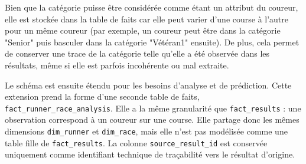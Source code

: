 \documentclass[12pt,a4paper]{article}
\begin{document}
Bien que la catégorie puisse être considérée comme étant un attribut du coureur, elle est stockée dans la table de faits car elle peut varier d'une course à l'autre pour un même coureur (par exemple, un coureur peut être dans la catégorie "Senior" puis basculer dans la catégorie "Vétéran1" ensuite). De plus, cela permet de conserver une trace de la catégorie telle qu'elle a été observée dans les résultats, même si elle est parfois incohérente ou mal extraite.

Le schéma est ensuite étendu pour les besoins d'analyse et de prédiction. Cette extension prend la forme d'une seconde table de faits, \texttt{fact\_runner\_race\_analysis}. Elle a la même granularité que \texttt{fact\_results} : une observation correspond à un coureur sur une course. Elle partage donc les mêmes dimensions \texttt{dim\_runner} et \texttt{dim\_race}, mais elle n'est pas modélisée comme une table fille de \texttt{fact\_results}. La colonne \texttt{source\_result\_id} est conservée uniquement comme identifiant technique de traçabilité vers le résultat d'origine.
\end{document}
